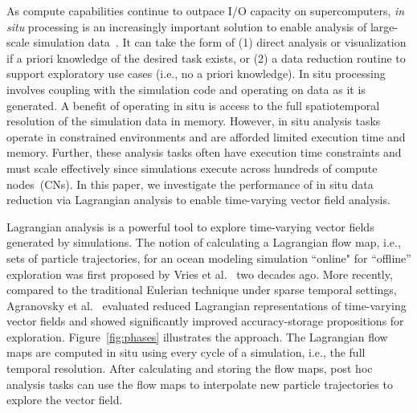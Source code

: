 As compute capabilities continue to outpace I/O capacity on supercomputers, \textit{in situ} processing is an increasingly important solution to enable analysis of large-scale simulation data~\cite{bauer2016situ}.
%
It can take the form of (1) direct analysis or visualization if a priori knowledge of the desired task exists, or (2) a data reduction routine to support exploratory use cases (i.e., no a priori knowledge). 
%
In situ processing involves coupling with the simulation code and operating on data as it is generated. 
%
A benefit of operating in situ is access to the full spatiotemporal resolution of the simulation data in memory.
%
However, in situ analysis tasks operate in constrained environments and are afforded limited execution time and memory.
%
Further, these analysis tasks often have execution time constraints and must scale effectively since simulations execute across hundreds of compute nodes~(CNs).
%
%
In this paper, we investigate the performance of in situ data reduction via Lagrangian analysis to enable time-varying vector field analysis.
%


Lagrangian analysis is a powerful tool to explore time-varying vector fields generated by simulations.
%
The notion of calculating a Lagrangian flow map, i.e., sets of particle trajectories, for an ocean modeling simulation ``online" for ``offline'' exploration was first proposed by Vries et al.~\cite{vries2001calculating} two decades ago.
%
More recently, compared to the traditional Eulerian technique under sparse temporal settings, Agranovsky et al.~\cite{agranovsky2014improved} evaluated reduced Lagrangian representations of time-varying vector fields and showed significantly improved accuracy-storage propositions for exploration. 
%
Figure~\ref{fig:phases} illustrates the approach.
%
The Lagrangian flow maps 
are computed in situ using every cycle of a simulation, i.e., the full temporal resolution.
%
After calculating and storing the flow maps, post hoc analysis tasks can use the flow maps to interpolate new particle trajectories to explore the vector field.
%
%



